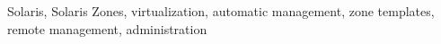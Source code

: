 Solaris, Solaris Zones, virtualization, automatic management, zone templates, remote management, administration
